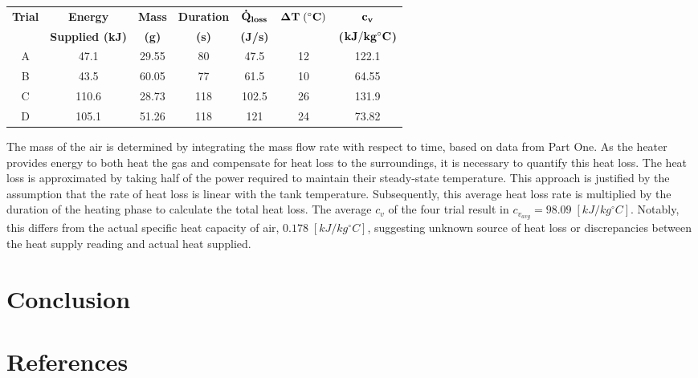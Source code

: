 \documentclass[12pt]{article}
\begin{document}
\begin{table}[h!]
\centering
\begin{tabular}{|c|c|c|c|c|c|c|}
\hline
\textbf{Trial} & \textbf{Energy} & \textbf{Mass} & \textbf{Duration} & \textbf{$\bf \dot Q_{loss}$} & \textbf{$\bf \Delta T \; (^{\circ}C)$} & \textbf{$\bf c_v$} \\
& \textbf{Supplied (kJ)} & \textbf{(g)} & \textbf{(s)} & \textbf{(J/s)} &  & \textbf{($\bf kJ/ kg ^{\circ}C$)} \\
\hline
A & 47.1 & 29.55 & 80 & 47.5 & 12 & 122.1 \\
\hline
B & 43.5 & 60.05 & 77 & 61.5 & 10 & 64.55 \\
\hline
C & 110.6 & 28.73 & 118 & 102.5 & 26 & 131.9 \\
\hline
D & 105.1 & 51.26 & 118 & 121 & 24 & 73.82 \\
\hline
\end{tabular}
\end{table}

The mass of the air is determined by integrating the mass flow rate with respect to time, based on data from Part One. As the heater provides energy to both heat the gas and compensate for heat loss to the surroundings, it is necessary to quantify this heat loss. The heat loss is approximated by taking half of the power required to maintain their steady-state temperature. This approach is justified by the assumption that the rate of heat loss is linear with the tank temperature. Subsequently, this average heat loss rate is multiplied by the duration of the heating phase to calculate the total heat loss. The average $c_v$ of the four trial result in $c_{v_{avg}} = 98.09 \; [kJ/ kg ^{\circ}C]$. Notably, this differs from the actual specific heat capacity of air, $0.178 \; [kJ/ kg ^{\circ}C]$, suggesting unknown source of heat loss or discrepancies between the heat supply reading and actual heat supplied.

\section{Conclusion}


\section{References}






\newpage
\begin{thebibliography}{9}

\end{thebibliography}
\end{document}

